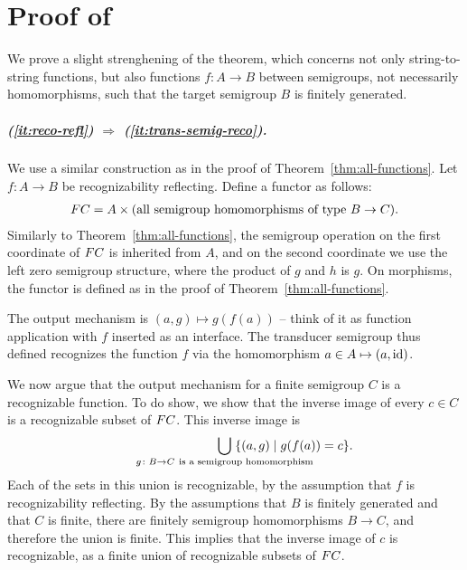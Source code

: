 \section{Proof of~}
    We prove a slight strenghening of the theorem, which concerns not only string-to-string functions, but also functions $f\colon A \to B$ between semigroups, not necessarily homomorphisms, such that the target semigroup $B$ is finitely generated.

    \subparagraph{(\ref{it:reco-refl}) $\Rightarrow$ (\ref{it:trans-semig-reco}).}  We  use a similar construction as in the proof of Theorem~\ref{thm:all-functions}. Let  $f\colon A \to B$  be recognizability reflecting.  Define  a functor as follows: 
    \begin{align*}
        \functor C = A \times \text{(all semigroup homomorphisms of type $B \to C$)}.
    \end{align*}
    Similarly to Theorem~\ref{thm:all-functions}, the semigroup operation on the first coordinate of $\functor C$ is inherited from $A$, and on the second coordinate we use the left zero semigroup structure,  where the product of $g$ and $h$ is $g$.     On morphisms, the functor is defined as in the proof of Theorem~\ref{thm:all-functions}. 

    The output mechanism  is $(a,g) \mapsto g(f(a))$ -- think of it as function application with $f$ inserted as an interface. The transducer semigroup thus defined recognizes the function $f$ via the homomorphism $a \in A  \mapsto  (a,\mathrm{id})$.
    
    We now argue that the output mechanism for a finite semigroup $C$ is a recognizable function.
     To do show, we show that the inverse image of every $c \in C$ is a  recognizable subset of $\functor C$. This inverse image is
    \begin{align*}
    \qquad\qquad\qquad\qquad \bigcup_{\mathclap{g\colon B \to C\ \text{is a semigroup homomorphism}}} \; \{(a,g) \mid g(f(a))=c \}.
    \end{align*}
    Each of the sets in this union is recognizable, by the assumption that $f$ is recognizability reflecting.     By the assumptions that $B$ is finitely generated and that $C$ is finite, there are finitely semigroup homomorphisms $B \to C$, and therefore the union is finite. This implies that the inverse image of $c$ is recognizable, as a finite union of recognizable subsets of  $\functor C$.
    
